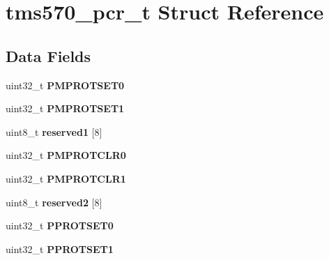 \hypertarget{structtms570__pcr__t}{}\section{tms570\+\_\+pcr\+\_\+t Struct Reference}
\label{structtms570__pcr__t}
\subsection*{Data Fields}
\begin{DoxyCompactItemize}
\item 
\mbox{\label{structtms570__pcr__t_a877004b8be1da8ab6d8448ac1d8fc30d}} 
uint32\+\_\+t {\bfseries P\+M\+P\+R\+O\+T\+S\+E\+T0}
\item 
\mbox{\label{structtms570__pcr__t_a98191a98c68fe2a3c30a4b4b12ac6d0d}} 
uint32\+\_\+t {\bfseries P\+M\+P\+R\+O\+T\+S\+E\+T1}
\item 
\mbox{\label{structtms570__pcr__t_a0ed2391ab9ddfc17e83f6f288ad01214}} 
uint8\+\_\+t {\bfseries reserved1} \mbox{[}8\mbox{]}
\item 
\mbox{\label{structtms570__pcr__t_a957d90c1e1fc3d81314587f1d7abadf6}} 
uint32\+\_\+t {\bfseries P\+M\+P\+R\+O\+T\+C\+L\+R0}
\item 
\mbox{\label{structtms570__pcr__t_a0907c97cf83203bab533158da7b30ef7}} 
uint32\+\_\+t {\bfseries P\+M\+P\+R\+O\+T\+C\+L\+R1}
\item 
\mbox{\label{structtms570__pcr__t_a1038bf5dcebd34cbc46bf8096a9899cd}} 
uint8\+\_\+t {\bfseries reserved2} \mbox{[}8\mbox{]}
\item 
\mbox{\label{structtms570__pcr__t_a2654ccdbc5f92ca3def2ecdf2614b432}} 
uint32\+\_\+t {\bfseries P\+P\+R\+O\+T\+S\+E\+T0}
\item 
\mbox{\label{structtms570__pcr__t_a9de4d31e70ab5ada41f00c66e51fdee9}} 
uint32\+\_\+t {\bfseries P\+P\+R\+O\+T\+S\+E\+T1}
\item 
\mbox{\label{structtms570__pcr__t_ae607169a675bae4a282adfd3bcdb88f6}} 

\end{DoxyCompactItemize}
